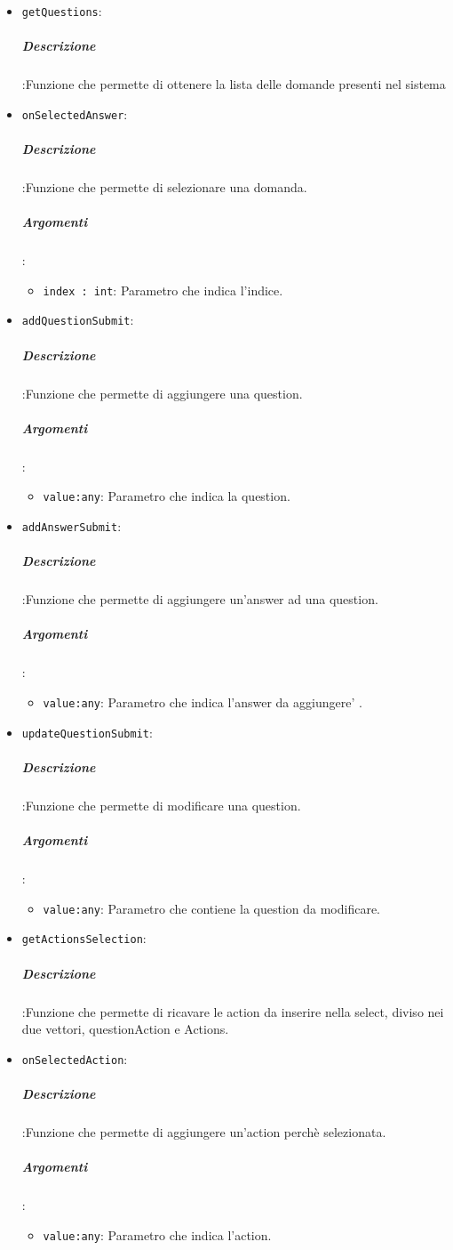 \documentclass[../DefinizioneDiProdotto_v3.0.0.tex]{subfiles}
\begin{document}
						\begin{itemize}
							\item \texttt{getQuestions}:
							\subparagraph{Descrizione}:Funzione che permette di ottenere la lista delle domande presenti nel sistema

							\item \texttt{onSelectedAnswer}:
							\subparagraph{Descrizione}:Funzione che permette di selezionare una domanda.
							\subparagraph{Argomenti}:
							\begin{itemize}
								\item \texttt{index : int}: Parametro che indica l'indice.
							\end{itemize}
							
							\item \texttt{addQuestionSubmit}:
							\subparagraph{Descrizione}:Funzione che permette di aggiungere una question.
							\subparagraph{Argomenti}:
							\begin{itemize}
								\item \texttt{value:any}: Parametro che indica la question.
							\end{itemize}					
														
							\item \texttt{addAnswerSubmit}:
							\subparagraph{Descrizione}:Funzione che permette di aggiungere un'answer ad una question.
							\subparagraph{Argomenti}:
							\begin{itemize}
								\item \texttt{value:any}: Parametro che indica l'answer da aggiungere' .
							\end{itemize}
							
							\item \texttt{updateQuestionSubmit}:
							\subparagraph{Descrizione}:Funzione che permette di modificare una question.
							\subparagraph{Argomenti}:
							\begin{itemize}
								\item \texttt{value:any}: Parametro che contiene la question da modificare.
							\end{itemize}

							\item \texttt{getActionsSelection}:
							\subparagraph{Descrizione}:Funzione che permette di ricavare le action da inserire nella select, diviso nei due vettori, questionAction e Actions.


							\item \texttt{onSelectedAction}:
							\subparagraph{Descrizione}:Funzione che permette di aggiungere un'action perchè selezionata.
							\subparagraph{Argomenti}:
							\begin{itemize}
								\item \texttt{value:any}: Parametro che indica l'action.
							\end{itemize}


\end{itemize}
\end{document}

